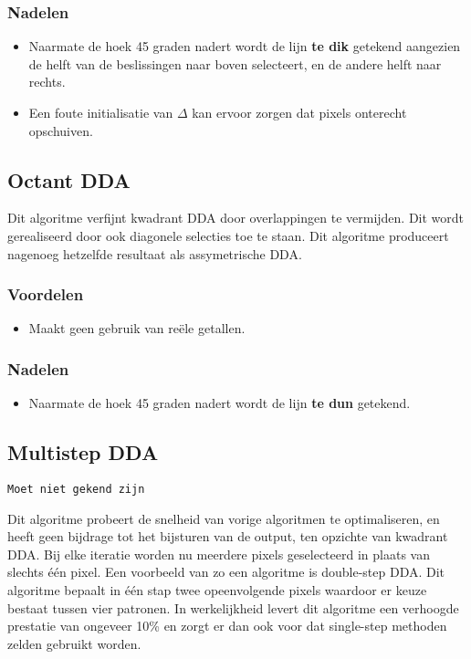 \documentclass{report}
\begin{document}
	\subsubsection{Nadelen}
	\begin{itemize}
		\item Naarmate de hoek 45 graden nadert wordt de lijn \textbf{te dik} getekend aangezien de helft van de beslissingen naar boven selecteert, en de andere helft naar rechts.
		\item Een foute initialisatie van $\Delta$ kan ervoor zorgen dat pixels onterecht opschuiven.
	\end{itemize}

	\subsection{Octant DDA}
	Dit algoritme verfijnt kwadrant DDA door overlappingen te vermijden. Dit wordt gerealiseerd door ook diagonele selecties toe te staan. Dit algoritme produceert nagenoeg hetzelfde resultaat als assymetrische DDA.
	\subsubsection{Voordelen}
	\begin{itemize}
		\item Maakt geen gebruik van reële getallen.
	\end{itemize}
		\subsubsection{Nadelen}
	\begin{itemize}
		\item Naarmate de hoek 45 graden nadert wordt de lijn \textbf{te dun} getekend.
	\end{itemize}
	
	\subsection{Multistep DDA}
	\texttt{Moet niet gekend zijn}	
	\newline	
	
	\setlength{\parindent}{0cm} Dit algoritme probeert de snelheid van vorige algoritmen te optimaliseren, en heeft geen bijdrage tot het bijsturen van de output, ten opzichte van kwadrant DDA. Bij elke iteratie worden nu meerdere pixels geselecteerd in plaats van slechts één pixel. Een voorbeeld van zo een algoritme is double-step DDA. Dit algoritme bepaalt in één stap twee opeenvolgende pixels waardoor er keuze bestaat tussen vier patronen. In werkelijkheid levert dit algoritme een verhoogde prestatie van ongeveer 10\% en zorgt er dan ook voor dat single-step methoden zelden gebruikt worden.
	
\end{document}
